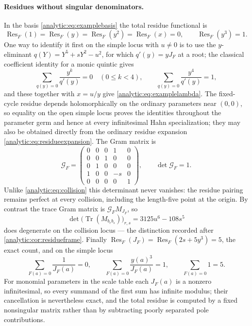 \documentclass[11pt,letterpaper]{article}
\theoremstyle{definition}
\theoremstyle{remark}
\newcommand{\Res}{\operatorname{Res}}
\newcommand{\Tr}{\operatorname{Tr}}
\numberwithin{equation}{section}
\begin{document}
\paragraph{Residues without singular denominators.}
In the basis \eqref{analytic:eq:examplebasis} the total residue functional
is
\begin{equation}\label{analytic:eq:examplelambda}
 \Res_F(1)=\Res_F(y)=\Res_F(y^2)=\Res_F(x)=0,\qquad \Res_F(y^3)=1 .
\end{equation}
One way to identify it first on the simple locus with $u\ne0$ is to use the
$y$-eliminant $q(Y)=Y^5+sY^2-u^2$, for which $q'(y)=yJ_F$ at a root; the
classical coefficient identity for a monic quintic gives
\[
 \sum_{q(y)=0}\frac{y^k}{q'(y)}=0\quad(0\le k<4),
 \qquad \sum_{q(y)=0}\frac{y^4}{q'(y)}=1 ,
\]
and these together with $x=u/y$ give
\eqref{analytic:eq:examplelambda}. The fixed-cycle residue depends
holomorphically on the ordinary parameters near $(0,0)$, so equality on the
open simple locus proves the identities throughout the parameter germ and
hence at every infinitesimal Hahn specialization; they may also be obtained
directly from the ordinary residue expansion
\eqref{analytic:eq:residueexpansion}. The Gram matrix is
\begin{equation}\label{analytic:eq:exampleGram}
 \mathcal G_F=\begin{pmatrix}
 0&0&0&1&0\\0&0&1&0&0\\0&1&0&0&0\\1&0&0&-s&0\\0&0&0&0&1
 \end{pmatrix},\qquad\det\mathcal G_F=1 .
\end{equation}
Unlike \eqref{analytic:eq:collision} this determinant never vanishes: the
residue pairing remains perfect at every collision, including the
length-five point at the origin. By contrast the trace Gram matrix is
$\mathcal G_FM_{J_F}$, so
\[
 \det\bigl(\Tr(M_{b_rb_s})\bigr)_{r,s}=3125u^6-108s^5
\]
does degenerate on the collision locus --- the distinction recorded after
\cref{analytic:cor:residueframe}. Finally
$\Res_F(J_F)=\Res_F(2s+5y^3)=5$, the exact count, and on the simple locus
\begin{equation}\label{analytic:eq:examplecancellation}
 \sum_{F(a)=0}\frac1{J_F(a)}=0,\qquad
 \sum_{F(a)=0}\frac{y(a)^3}{J_F(a)}=1,\qquad
 \sum_{F(a)=0}1=5 .
\end{equation}
For monomial parameters in the scale table each $J_F(a)$ is a nonzero
infinitesimal, so every summand of the first sum has infinite modulus; their
cancellation is nevertheless exact, and the total residue is computed by a
fixed nonsingular matrix rather than by subtracting poorly separated pole
contributions.
\end{document}
